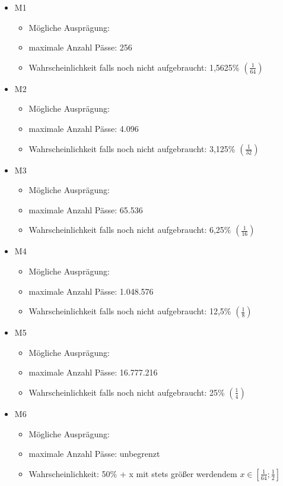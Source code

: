 \begin{NFT-Prop}
\begin{itemize}
    \item M1
    \begin{itemize}
    	\item Mögliche Ausprägung:  
    	\item maximale Anzahl Pässe: 256
    	\item Wahrscheinlichkeit falls noch nicht aufgebraucht: 1,5625\% $\left( \frac{1}{64} \right)$
    \end{itemize}
    \item M2
    \begin{itemize}
    	\item Mögliche Ausprägung:  
    	\item maximale Anzahl Pässe: 4.096
    	\item Wahrscheinlichkeit falls noch nicht aufgebraucht: 3,125\% $\left( \frac{1}{32} \right)$
    \end{itemize}
    \item M3
    \begin{itemize}
    	\item Mögliche Ausprägung:  
    	\item maximale Anzahl Pässe: 65.536
    	\item Wahrscheinlichkeit falls noch nicht aufgebraucht: 6,25\% $\left( \frac{1}{16} \right)$
    \end{itemize}
    \item M4
    \begin{itemize}
    	\item Mögliche Ausprägung:  
    	\item maximale Anzahl Pässe: 1.048.576
    	\item Wahrscheinlichkeit falls noch nicht aufgebraucht: 12,5\% $\left( \frac{1}{8} \right)$
    \end{itemize}
    \item M5
    \begin{itemize}
    	\item Mögliche Ausprägung:   
    	\item maximale Anzahl Pässe: 16.777.216
    	\item Wahrscheinlichkeit falls noch nicht aufgebraucht: 25\% $\left( \frac{1}{4} \right)$
    \end{itemize}
    \item M6
    \begin{itemize}
    	\item Mögliche Ausprägung: 
    	\item maximale Anzahl Pässe: unbegrenzt  
    	\item Wahrscheinlichkeit: 50\% + x mit stets größer werdendem $x \in \left[ \frac{1}{64}; \frac{1}{2} \right]$
    \end{itemize}
\end{itemize}


\end{NFT-Prop}
